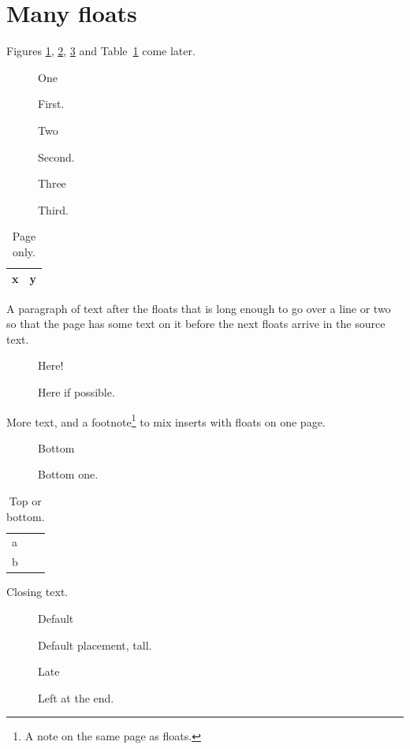 \documentclass{article}
\begin{document}
\section{Many floats}
Figures \ref{f1}, \ref{f2}, \ref{f3} and Table~\ref{t1} come later.

\begin{figure}[t]\centering\mbox{One}\vspace{150pt}\caption{First.}\label{f1}\end{figure}
\begin{figure}[t]\centering\mbox{Two}\vspace{150pt}\caption{Second.}\label{f2}\end{figure}
\begin{figure}[htbp]\centering\mbox{Three}\vspace{150pt}\caption{Third.}\label{f3}\end{figure}
\begin{table}[p]\centering\begin{tabular}{|c|c|}\hline x & y\\\hline\end{tabular}\caption{Page only.}\label{t1}\end{table}

A paragraph of text after the floats that is long enough to go over a line or two so
that the page has some text on it before the next floats arrive in the source text.

\begin{figure}[!h]\centering\mbox{Here!}\caption{Here if possible.}\end{figure}

More text, and a footnote\footnote{A note on the same page as floats.} to mix inserts
with floats on one page.

\begin{figure}[b]\centering\mbox{Bottom}\caption{Bottom one.}\end{figure}
\begin{table}[tb]\centering\begin{tabular}{l}a\\b\end{tabular}\caption{Top or bottom.}\end{table}

Closing text.
\begin{figure}\centering\mbox{Default}\vspace{300pt}\caption{Default placement, tall.}\end{figure}
\begin{figure}[h]\mbox{Late}\caption{Left at the end.}\end{figure}
\end{document}
